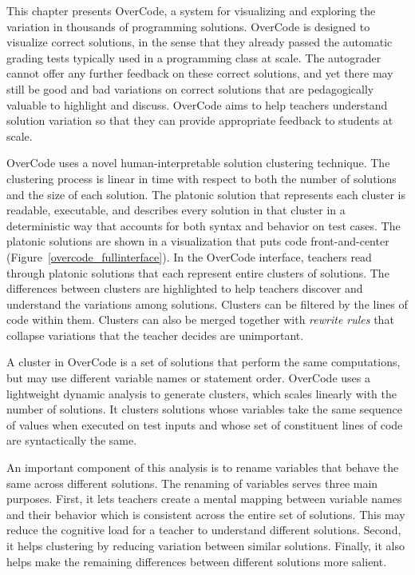 This chapter presents OverCode, a system for visualizing and exploring the variation in thousands of programming solutions. OverCode is designed to visualize correct solutions, in the sense that they already passed the automatic grading tests typically used in a programming class at scale. The autograder cannot offer any further feedback on these correct solutions, and yet there may still be good and bad variations on correct solutions that are pedagogically valuable to highlight and discuss. OverCode aims to help teachers understand solution variation so that they can provide appropriate feedback to students at scale.

OverCode uses a novel human-interpretable solution clustering technique. The clustering process is linear in time with respect to both the number of solutions and the size of each solution. The platonic solution that represents each cluster is readable, executable, and describes every solution in that cluster in a deterministic way that accounts for both syntax and behavior on test cases. The platonic solutions are shown in a visualization that puts code front-and-center (Figure~\ref{overcode_fullinterface}). In the OverCode interface, teachers read through platonic solutions that each represent entire clusters of solutions. The differences between clusters are highlighted to help teachers discover and understand the variations among solutions. Clusters can be filtered by the lines of code within them.  Clusters can also be merged together with {\em rewrite rules} that collapse variations that the teacher decides are unimportant. 

A cluster in OverCode is a set of solutions that perform the same computations, but may use different variable names or statement order.  OverCode uses a lightweight dynamic analysis to generate clusters, which scales linearly with the number of solutions. It clusters solutions whose variables take the same sequence of values when executed on test inputs and whose set of constituent lines of code are syntactically the same. 

An important component of this analysis is to rename variables that behave the same across different solutions. The renaming of variables serves three main purposes. First, it lets teachers create a mental mapping between variable names and their behavior which is consistent across the entire set of solutions. This may reduce the cognitive load for a teacher to understand different solutions. Second, it helps clustering by reducing variation between similar solutions. Finally, it also helps make the remaining differences between different solutions more salient. 

